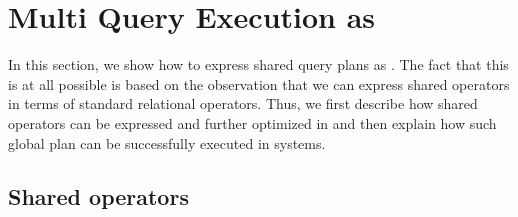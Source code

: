 \section{Multi Query Execution as \sql}
\label{sec:rewriting}

%
%
%

In this section, we show how to express shared query plans as \sql.  The fact
that this is at all possible is based on the observation that we can express
shared operators in terms of standard relational operators.  Thus, we first
describe how shared operators can be expressed and further optimized in \sql and
then explain how such global plan can be successfully executed in \qaasl
systems.

\subsection{Shared operators}
\label{sec:exp_shared_ops_sql}

